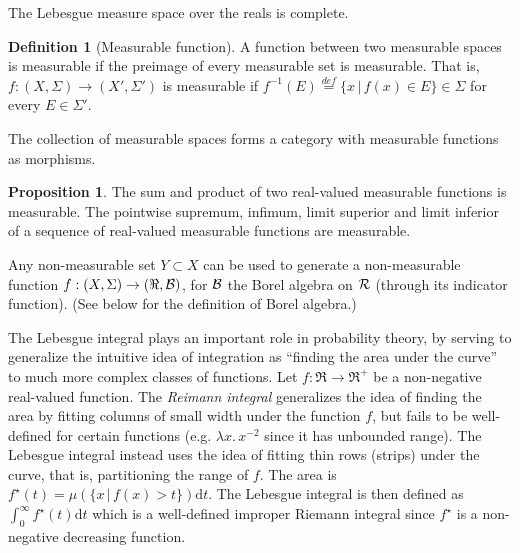 \documentclass{article}
\newcommand{\alt}{\,|\,}
\newcommand{\defeq}{\stackrel{{\scriptscriptstyle def}}{=}}
\theoremstyle{definition}
\newtheorem{definition}{Definition}[section]
\newtheorem{proposition}[theorem]{Proposition}
\begin{document}
The Lebesgue measure space over the reals is complete.
  

\begin{definition}[Measurable function]
  A function between two measurable spaces is measurable if the preimage of every measurable set is measurable. That is, \(f:(X,\Sigma) \rightarrow (X',\Sigma')\) is measurable if \(f^{-1}(E)\defeq \{x\alt f(x)\in E\} \in \Sigma\) for every \(E\in\Sigma'\).
\end{definition}

The collection of measurable spaces forms a category with measurable functions as morphisms.

\begin{proposition}
The sum and product of two real-valued measurable functions is measurable. The pointwise supremum, infimum, limit superior and limit inferior of a sequence of real-valued measurable functions are measurable.
\end{proposition}

Any non-measurable set \(Y \subset X\) can be used to generate a non-measurable function \(f:(X,\Sigma)\rightarrow (\Re, {\cal B})\), for \({\cal B}\) the Borel algebra on \(\cal R\) (through its indicator function). (See below for the definition of Borel algebra.)

The Lebesgue integral plays an important role in probability theory, by serving to generalize the intuitive idea of integration as ``finding the area under the curve'' to much more complex classes of functions. Let \(f:\Re \rightarrow \Re^+\) be a non-negative real-valued function. The {\em Reimann integral} generalizes the idea of finding the area by fitting columns of small width under the function \(f\), but fails to be well-defined for certain functions (e.g. \(\lambda x.\, x^{-2}\) since it has unbounded range). The Lebesgue integral instead uses the idea of fitting thin rows (strips) under the curve, that is, partitioning the range of \(f\). The area is \(f^{\star}(t)=\mu(\{x \alt f(x) > t\}) {\mathrm dt}\).  The Lebesgue integral is then defined as \(\int_0^{\infty} f^{\star}(t){\mathrm dt}\) which is a well-defined improper Riemann integral since \(f^{\star}\) is a non-negative decreasing function. 
\end{document}
